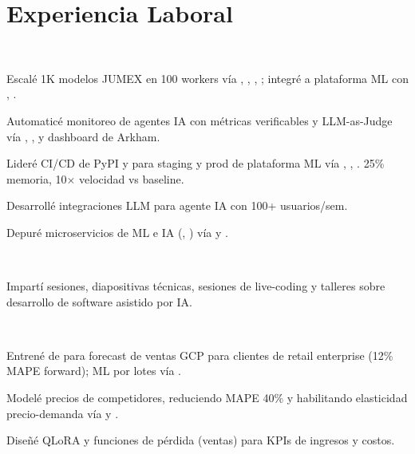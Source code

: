 \documentclass{tex/deedy-resume-openfont}
\begin{document}
\hfill
\begin{minipage}[t]{0.67\textwidth} 


\section{Experiencia Laboral}
\\
\vspace{\topsep}
\begin{tightemize}
    \item Escalé 1K modelos JUMEX en 100 workers  vía , , , ; integré a plataforma ML con , .
    \item Automaticé monitoreo de agentes IA con métricas verificables y LLM-as-Judge vía , ,  y dashboard de Arkham.
    \item Lideré CI/CD de PyPI y  para staging y prod de plataforma ML vía , , . 25\% memoria, 10$\times$ velocidad vs baseline.
    \item Desarrollé integraciones LLM para agente IA con 100+ usuarios/sem.
    \item Depuré microservicios de ML e IA (, ) vía  y .
\end{tightemize}
\sectionsep

\\
\begin{tightemize}
    \item Impartí sesiones, diapositivas técnicas, sesiones de live-coding y talleres sobre desarrollo de software asistido por IA.
\end{tightemize}
\sectionsep

\\
\begin{tightemize}
    \item Entrené  de  para forecast de ventas GCP para clientes de retail enterprise (12\% MAPE forward); ML por lotes  vía .
    \item Modelé precios de competidores, reduciendo MAPE 40\% y habilitando elasticidad precio-demanda vía  y .
    \item Diseñé QLoRA y funciones de pérdida (ventas) para KPIs de ingresos y costos.
\end{tightemize}
\sectionsep


\end{minipage}
\end{document}
